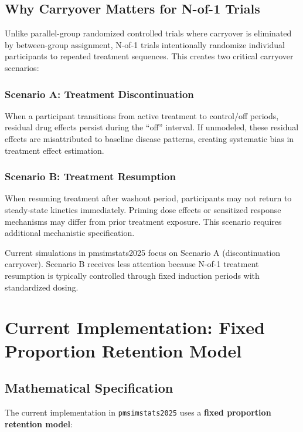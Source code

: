 \documentclass[11pt,a4paper]{article}
\begin{document}
\subsection{Why Carryover Matters for N-of-1 Trials}

Unlike parallel-group randomized controlled trials where carryover is eliminated by between-group assignment, N-of-1 trials intentionally randomize individual participants to repeated treatment sequences. This creates two critical carryover scenarios:

\subsubsection{Scenario A: Treatment Discontinuation}

When a participant transitions from active treatment to control/off periods, residual drug effects persist during the ``off'' interval. If unmodeled, these residual effects are misattributed to baseline disease patterns, creating systematic bias in treatment effect estimation.

\subsubsection{Scenario B: Treatment Resumption}

When resuming treatment after washout period, participants may not return to steady-state kinetics immediately. Priming dose effects or sensitized response mechanisms may differ from prior treatment exposure. This scenario requires additional mechanistic specification.

Current simulations in pmsimstats2025 focus on Scenario A (discontinuation carryover). Scenario B receives less attention because N-of-1 treatment resumption is typically controlled through fixed induction periods with standardized dosing.

\section{Current Implementation: Fixed Proportion Retention Model}
\label{sec:current}

\subsection{Mathematical Specification}

The current implementation in \texttt{pmsimstats2025} uses a \textbf{fixed proportion retention model}:
\end{document}
